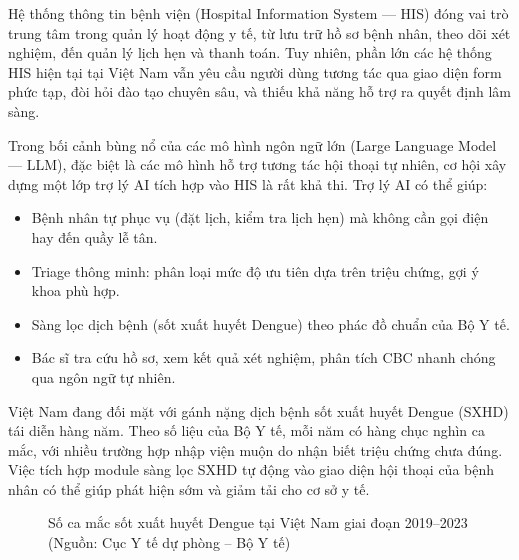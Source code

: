 \documentclass[oneside, a4paper]{book}
\theoremstyle{plain}
\theoremstyle{plain}
\theoremstyle{definition}
\theoremstyle{remark}
\begin{document}
Hệ thống thông tin bệnh viện (Hospital Information System --- HIS) đóng vai trò trung tâm trong quản lý hoạt động y tế, từ lưu trữ hồ sơ bệnh nhân, theo dõi xét nghiệm, đến quản lý lịch hẹn và thanh toán. Tuy nhiên, phần lớn các hệ thống HIS hiện tại tại Việt Nam vẫn yêu cầu người dùng tương tác qua giao diện form phức tạp, đòi hỏi đào tạo chuyên sâu, và thiếu khả năng hỗ trợ ra quyết định lâm sàng.

Trong bối cảnh bùng nổ của các mô hình ngôn ngữ lớn (Large Language Model --- LLM), đặc biệt là các mô hình hỗ trợ tương tác hội thoại tự nhiên, cơ hội xây dựng một lớp trợ lý AI tích hợp vào HIS là rất khả thi. Trợ lý AI có thể giúp:

\begin{itemize}
  \item Bệnh nhân tự phục vụ (đặt lịch, kiểm tra lịch hẹn) mà không cần gọi điện hay đến quầy lễ tân.
  \item Triage thông minh: phân loại mức độ ưu tiên dựa trên triệu chứng, gợi ý khoa phù hợp.
  \item Sàng lọc dịch bệnh (sốt xuất huyết Dengue) theo phác đồ chuẩn của Bộ Y tế.
  \item Bác sĩ tra cứu hồ sơ, xem kết quả xét nghiệm, phân tích CBC nhanh chóng qua ngôn ngữ tự nhiên.
\end{itemize}

Việt Nam đang đối mặt với gánh nặng dịch bệnh sốt xuất huyết Dengue (SXHD) tái diễn hàng năm. Theo số liệu của Bộ Y tế, mỗi năm có hàng chục nghìn ca mắc, với nhiều trường hợp nhập viện muộn do nhận biết triệu chứng chưa đúng. Việc tích hợp module sàng lọc SXHD tự động vào giao diện hội thoại của bệnh nhân có thể giúp phát hiện sớm và giảm tải cho cơ sở y tế.

\begin{figure}[H]
\centering
{}
\caption{Số ca mắc sốt xuất huyết Dengue tại Việt Nam giai đoạn 2019--2023 (Nguồn: Cục Y tế dự phòng -- Bộ Y tế)}
\label{fig:dengue-stats}
\end{figure}
\end{document}
